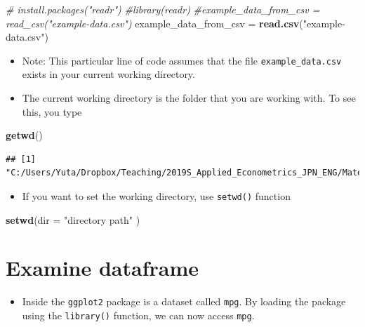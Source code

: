 \documentclass[]{book}
\newenvironment{Shaded}{\begin{snugshade}}{\end{snugshade}}
\newcommand{\KeywordTok}[1]{\textcolor[rgb]{0.13,0.29,0.53}{\textbf{#1}}}
\newcommand{\DataTypeTok}[1]{\textcolor[rgb]{0.13,0.29,0.53}{#1}}
\newcommand{\StringTok}[1]{\textcolor[rgb]{0.31,0.60,0.02}{#1}}
\newcommand{\CommentTok}[1]{\textcolor[rgb]{0.56,0.35,0.01}{\textit{#1}}}
\newcommand{\NormalTok}[1]{#1}
\providecommand{\tightlist}{%
  \setlength{\itemsep}{0pt}\setlength{\parskip}{0pt}}
\begin{document}
\begin{Shaded}
\begin{Highlighting}[]
\CommentTok{# install.packages("readr") }
\CommentTok{#library(readr)}
\CommentTok{#example_data_from_csv = read_csv("example-data.csv")}
\NormalTok{example_data_from_csv =}\StringTok{ }\KeywordTok{read.csv}\NormalTok{(}\StringTok{"example-data.csv"}\NormalTok{)}
\end{Highlighting}
\end{Shaded}

\begin{itemize}
\tightlist
\item
  Note: This particular line of code assumes that the file
  \texttt{example\_data.csv} exists in your current working directory.
\item
  The current working directory is the folder that you are working with.
  To see this, you type
\end{itemize}

\begin{Shaded}
\begin{Highlighting}[]
\KeywordTok{getwd}\NormalTok{()}
\end{Highlighting}
\end{Shaded}

\begin{verbatim}
## [1] "C:/Users/Yuta/Dropbox/Teaching/2019S_Applied_Econometrics_JPN_ENG/Material_Github"
\end{verbatim}

\begin{itemize}
\tightlist
\item
  If you want to set the working directory, use \texttt{setwd()}
  function
\end{itemize}

\begin{Shaded}
\begin{Highlighting}[]
\KeywordTok{setwd}\NormalTok{(}\DataTypeTok{dir =} \StringTok{"directory path"}\NormalTok{ )}
\end{Highlighting}
\end{Shaded}

\section{Examine dataframe}\label{examine-dataframe}

\begin{itemize}
\tightlist
\item
  Inside the \texttt{ggplot2} package is a dataset called \texttt{mpg}.
  By loading the package using the \texttt{library()} function, we can
  now access \texttt{mpg}.
\end{itemize}
\end{document}
